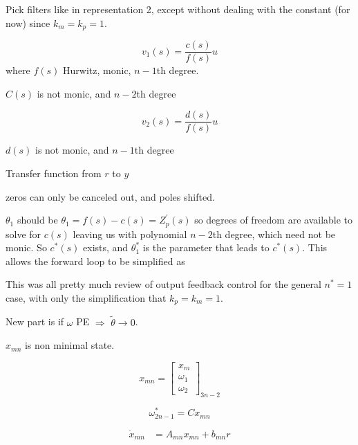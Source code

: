 Pick filters like in representation 2, except without dealing with the constant (for now) since $k_{m}=k_{p}=1$.

\begin{equation*}
  v_{1}(s)=\frac{c(s)}{f(s)}u
\end{equation*}
where $f(s)$ Hurwitz, monic, $n-1$th degree.

$C(s)$ is not monic, and $n-2$th degree

\begin{equation*}
  v_{2}(s)=\frac{d(s)}{f(s)}u
\end{equation*}

$d(s)$ is not monic, and $n-1$th degree

Transfer function from $r$ to $y$

zeros can only be canceled out, and poles shifted.


$\theta_{1}$ should be $\theta_{1}=f(s)-c(s)=Z_{p}^{\prime}(s)$ so degrees of freedom are available to solve for $c(s)$ leaving us with polynomial $n-2$th degree, which need not be monic.
So $c^{*}(s)$ exists, and $\theta_{1}^{*}$ is the parameter that leads to $c^{*}(s)$.
This allows the forward loop to be simplified as


This was all pretty much review of output feedback control for the general $n^{*}=1$ case, with only the simplification that $k_{p}=k_{m}=1$.

New part is if $\omega$ PE $\Rightarrow$ $\tilde{\theta}\rightarrow0$.


$x_{mn}$ is non minimal state.

\begin{equation*}
  x_{mn}=
  \begin{bmatrix}
    x_{m} \\
    \omega_{1} \\
    \omega_{2}
  \end{bmatrix}_{3n-2}
\end{equation*}

\begin{equation*}
  \omega_{2n-1}^{*}=Cx_{mn}
\end{equation*}

\begin{align*}
  \dot{x}_{mn}&=A_{mn}x_{mn}+b_{mn}r
\end{align*}


